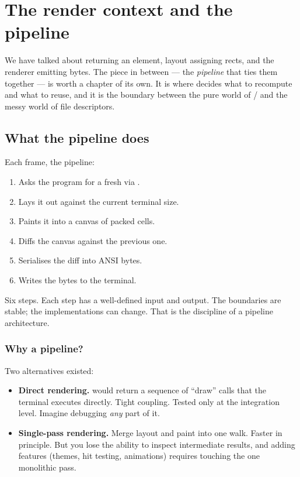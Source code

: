 \chapter{The render context and the pipeline}
\label{ch:pipeline}

\begin{aside}
We have talked about  returning an element, layout
assigning rects, and the renderer emitting bytes. The piece in
between --- the \emph{pipeline} that ties them together --- is
worth a chapter of its own. It is where \maya{} decides what to
recompute and what to reuse, and it is the boundary between the
pure world of / and the messy world of
file descriptors.
\end{aside}

\section{What the pipeline does}

Each frame, the pipeline:

\begin{enumerate}[leftmargin=*]
  \item Asks the program for a fresh  via
    .
  \item Lays it out against the current terminal size.
  \item Paints it into a canvas of packed cells.
  \item Diffs the canvas against the previous one.
  \item Serialises the diff into ANSI bytes.
  \item Writes the bytes to the terminal.
\end{enumerate}

Six steps. Each step has a well-defined input and output. The
boundaries are stable; the implementations can change. That is
the discipline of a pipeline architecture.

\subsection*{Why a pipeline?}

Two alternatives existed:

\begin{itemize}[leftmargin=*]
  \item \textbf{Direct rendering.}  would return a
    sequence of ``draw'' calls that the terminal executes
    directly. Tight coupling. Tested only at the integration
    level. Imagine debugging \emph{any} part of it.
  \item \textbf{Single-pass rendering.} Merge layout and paint
    into one walk. Faster in principle. But you lose the ability
    to inspect intermediate results, and adding features
    (themes, hit testing, animations) requires touching the one
    monolithic pass.
\end{itemize}

